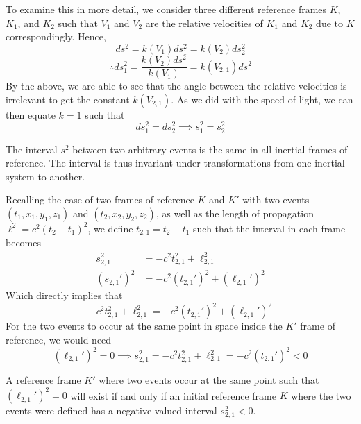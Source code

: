 \documentclass{article}
\begin{document}
			To examine this in more detail, we consider three different reference frames $K$, $K_1$, and $K_2$ such that $V_1$ and $V_2$ are the relative velocities of $K_1$ and $K_2$ due to $K$ correspondingly. Hence,
			$$ ds^2 = k(V_1)ds_1^2 = k(V_2)ds_2^2 $$ 
			$$ \therefore ds_1^2 = \frac{k(V_2)ds^2}{k(V_1)} = k(V_{2,1})ds^2$$
			By the above, we are able to see that the angle between the relative velocities is irrelevant to get the constant $k(V_{2,1})$. As we did with the speed of light, we can then equate $k=1$ such that
			$$ ds_1^2 = ds_2^2 \implies s_1^2 = s_2^2 $$
			\begin{thm}
				The interval $s^2$ between two arbitrary events is the same in all inertial frames of reference. The interval is thus invariant under transformations from one inertial system to another.
			\end{thm} 
			Recalling the case of two frames of reference $K$ and $K'$ with two events $(t_1,x_1,y_1,z_1)$ and $(t_2,x_2,y_2,z_2)$, as well as the length of propagation $\ell^2 = c^2(t_2-t_1)^2$, we define $t_{2,1}=t_2-t_1$ such that the interval in each frame becomes
			\begin{align*}
				s_{2,1}^2 &= - c^2 t_{2,1}^2 + \ell_{2,1}^2 \\
				(s_{2,1}')^2 &= - c^2 (t_{2,1}')^2 + (\ell_{2,1}')^2 
			\end{align*}
			Which directly implies that
			$$ - c^2 t_{2,1}^2 + \ell_{2,1}^2 = - c^2 (t_{2,1}')^2 + (\ell_{2,1}')^2 $$
			For the two events to occur at the same point in space inside the $K'$ frame of reference, we would need
			$$ (\ell_{2,1}')^2 = 0 \implies s_{2,1}^2 = - c^2 t_{2,1}^2 + \ell_{2,1}^2 = - c^2(t_{2,1}')^2 < 0 $$
			\begin{thm}
				A reference frame $K'$ where two events occur at the same point such that $(\ell_{2,1}')^2 = 0$ will exist if and only if an initial reference frame $K$ where the two events were defined has a negative valued interval $s_{2,1}^2 < 0$. 
			\end{thm}
\end{document}
